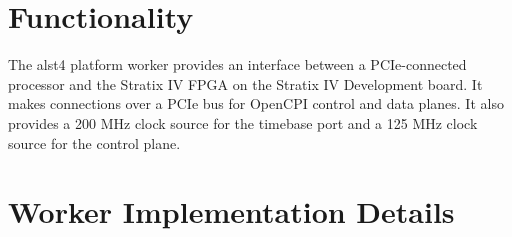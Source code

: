 \section*{Functionality}
\begin{flushleft}
The alst4 platform worker provides an interface between a PCIe-connected processor and the Stratix IV FPGA on the Stratix IV Development board. It makes connections over a PCIe bus for OpenCPI control and data planes. It also provides a 200 MHz clock source for the timebase port and a 125 MHz clock source for the control plane.
\end{flushleft}

\section*{Worker Implementation Details}
